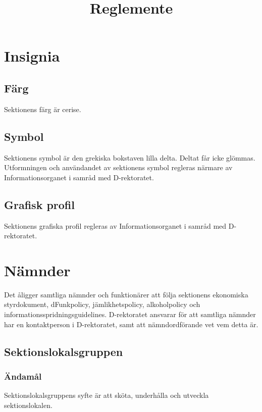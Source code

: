 \documentclass{dgovdoc}
\title{Reglemente}
\begin{document}
\maketitle

\section{Insignia}

\subsection{Färg}

Sektionens färg är cerise.

\subsection{Symbol}

Sektionens symbol är den grekiska bokstaven lilla delta. Deltat får icke
glömmas. Utformningen och användandet av sektionens symbol regleras närmare av
Informationsorganet i samråd med D-rektoratet.

\subsection{Grafisk profil}

Sektionens grafiska profil regleras av Informationsorganet i samråd med
D-rektoratet.

\section{Nämnder}

Det åligger samtliga nämnder och funktionärer att följa sektionens ekonomiska
styrdokument, dFunkpolicy, jämlikhetspolicy, alkoholpolicy och
informationsspridningsguidelines. D-rektoratet ansvarar för att samtliga
nämnder har en kontaktperson i D-rektoratet, samt att nämndordförande vet vem
detta är.

\subsection{Sektionslokalsgruppen}

\subsubsection{Ändamål}

Sektionslokalsgruppens syfte är att sköta, underhålla och utveckla
sektionslokalen.
\end{document}
